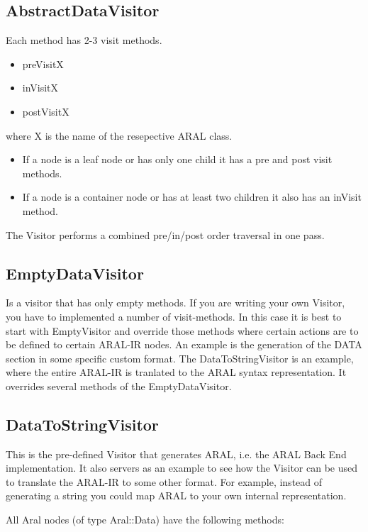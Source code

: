 \subsection{AbstractDataVisitor}

Each method has 2-3 visit methods.

\begin{itemize}
\item preVisitX
\item inVisitX
\item postVisitX
\end{itemize}

where X is the name of the resepective ARAL class.

\begin{itemize}
\item If a node is a leaf node or has only one child it has a pre and post
visit methods.
\item If a node is a container node or has at least two
children it also has an inVisit method.
\end{itemize}

The Visitor performs a combined pre/in/post order traversal in one pass.

\subsection{EmptyDataVisitor}
Is a visitor that has only empty methods. If you are writing your own
Visitor, you have to implemented a number of visit-methods. In this
case it is best to start with EmptyVisitor and override those methods
where certain actions are to be defined to certain ARAL-IR nodes. An example is the
generation of the DATA section in some specific custom format. The DataToStringVisitor
is an example, where the entire ARAL-IR is tranlated to the ARAL syntax representation. It overrides
several methods of the EmptyDataVisitor.

\subsection{DataToStringVisitor}
This is the pre-defined Visitor that generates ARAL, i.e. the ARAL
Back End implementation. It also servers as an example to see how the
Visitor can be used to translate the ARAL-IR to some other format. For
example, instead of generating a string you could map ARAL to your own
internal representation.

All Aral nodes (of type Aral::Data) have the following methods:

